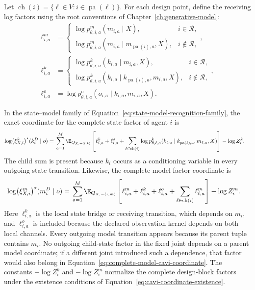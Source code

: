 Let \(\operatorname{ch}(i)=\{\ell\in V:i\in\operatorname{pa}(\ell)\}\). For each design point, define the receiving log factors using the root conventions of Chapter~\ref{ch:generative-model}:
\begin{align}
\ell_{i,a}^{m}
&=
\begin{cases}
\log p_{\theta,i,a}^{m}(m_{i,a}\mid X),&i\in\mathcal R,\\
\log p_{\theta,i,a}^{m}(m_{i,a}\mid m_{\operatorname{pa}(i),a},X),&i\notin\mathcal R,
\end{cases},
\label{eq:model-receiving-log-factor}\\
\ell_{i,a}^{k}
&=
\begin{cases}
\log p_{\theta,i,a}^{k}(k_{i,a}\mid m_{i,a},X),&i\in\mathcal R,\\
\log p_{\theta,i,a}^{k}(k_{i,a}\mid k_{\operatorname{pa}(i),a},m_{i,a},X),&i\notin\mathcal R,
\end{cases},
\label{eq:state-receiving-log-factor}\\
\ell_{i,a}^{o}
&=\log p_{\theta,i,a}^{o}(o_{i,a}\mid k_{i,a},m_{i,a},X).
\label{eq:observation-log-factor}
\end{align}

In the state--model family of Equation~\eqref{eq:state-model-recognition-family}, the exact coordinate for the complete state factor of agent \(i\) is
\begin{align}
\log \bigl(\xi^k_{X,i}\bigr)^\star(k_i^D\mid o)
={}&\sum_{a=1}^{M}\E_{Q_{X,-(i,k)}}\left[
\ell_{i,a}^{k}+\ell_{i,a}^{o}
+\sum_{\ell\in\operatorname{ch}(i)}
\log p_{\theta,\ell,a}^{k}
(k_{\ell,a}\mid k_{\operatorname{pa}(\ell),a},m_{\ell,a},X)
\right]
-\log Z_i^k.
\label{eq:complete-state-cavi-coordinate}
\end{align}
The child sum is present because \(k_i\) occurs as a conditioning variable in every outgoing state transition. Likewise, the complete model-factor coordinate is
\begin{align}
\log \bigl(\xi^m_{X,i}\bigr)^\star(m_i^D\mid o)
={}&\sum_{a=1}^{M}\E_{Q_{X,-(i,m)}}\left[
\ell_{i,a}^{m}+\ell_{i,a}^{k}+\ell_{i,a}^{o}
+\sum_{\ell\in\operatorname{ch}(i)}
\ell_{\ell,a}^{m}
\right]
-\log Z_i^m.
\label{eq:complete-model-cavi-coordinate}
\end{align}
Here \(\ell_{i,a}^{k}\) is the local state bridge or receiving transition, which depends on \(m_i\), and \(\ell_{i,a}^{o}\) is included because the declared observation kernel depends on both local channels. Every outgoing model transition appears because its parent tuple contains \(m_i\). No outgoing child-state factor in the fixed joint depends on a parent model coordinate; if a different joint introduced such a dependence, that factor would also belong in Equation~\eqref{eq:complete-model-cavi-coordinate}. The constants \(-\log Z_i^k\) and \(-\log Z_i^m\) normalize the complete design-block factors under the existence conditions of Equation~\eqref{eq:cavi-coordinate-existence}.

